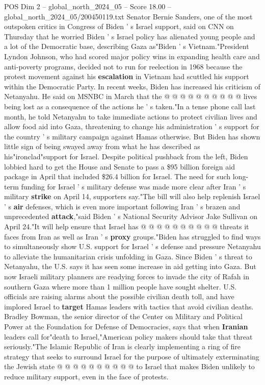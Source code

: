\begin{textsample}{POS Dim 2 – global\_north\_2024\_05 – Score 18.00 – global\_north\_2024\_05/200450119.txt}
Senator Bernie Sanders, one of the most outspoken critics in Congress of Biden ' s Israel support, said on CNN on Thursday that he worried Biden ' s Israel policy has alienated young people and a lot of the Democratic base, describing Gaza as"Biden ' s Vietnam."President Lyndon Johnson, who had scored major policy wins in expanding health care and anti-poverty programs, decided not to run for reelection in 1968 because the protest movement against his \textbf{escalation} in Vietnam had scuttled his support within the Democratic Party.
In recent weeks, Biden has increased his criticism of Netanyahu.
He said on MSNBC in March that the @ @ @ @ @ @ @ @ @ @ lives being lost as a consequence of the actions he ' s taken."In a tense phone call last month, he told Netanyahu to take immediate actions to protect civilian lives and allow food aid into Gaza, threatening to change his administration ' s support for the country ' s military campaign against Hamas otherwise.
But Biden has shown little sign of being swayed away from what he has described as his"ironclad"support for Israel.
Despite political pushback from the left, Biden lobbied hard to get the House and Senate to pass a \$95 billion foreign aid package in April that included \$26.4 billion for Israel.
The need for such long-term funding for Israel ' s military defense was made more clear after Iran ' s military \textbf{strike} on April 14, supporters say."The bill will also help replenish Israel ' s \textbf{air} defenses, which is even more important following Iran ' s brazen and unprecedented \textbf{attack},"said Biden ' s National Security Advisor Jake Sullivan on April 24."It will help ensure that Israel has @ @ @ @ @ @ @ @ @ @ threats it faces from Iran as well as Iran ' s \textbf{proxy} groups."Biden has struggled to find ways to simultaneously show U.S. support for Israel ' s defense and pressure Netanyahu to alleviate the humanitarian crisis unfolding in Gaza.
Since Biden ' s threat to Netanyahu, the U.S. says it has seen some increase in aid getting into Gaza.
But now Israeli military planners are readying forces to invade the city of Rafah in southern Gaza where more than 1 million people have sought shelter.
U.S. officials are raising alarms about the possible civilian death toll, and have implored Israel to \textbf{target} Hamas leaders with tactics that avoid civilian deaths.
Bradley Bowman, the senior director of the Center on Military and Political Power at the Foundation for Defense of Democracies, says that when \textbf{Iranian} leaders call for"death to Israel,"American policy makers should take that threat seriously."The Islamic Republic of Iran is clearly implementing a ring of fire strategy that seeks to surround Israel for the purpose of ultimately exterminating the Jewish state @ @ @ @ @ @ @ @ @ @ to Israel that makes Biden unlikely to reduce military support, even in the face of protests.

\end{textsample}
